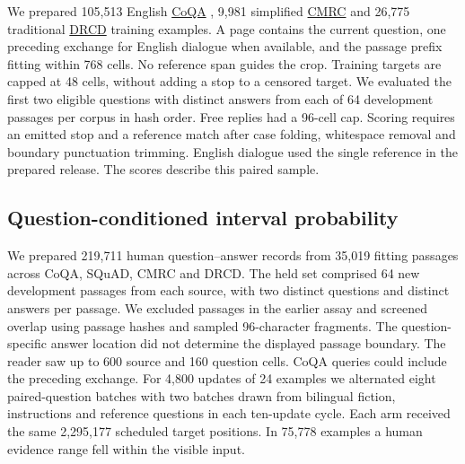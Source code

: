 \documentclass[12pt,a4paper]{article}
\providecommand{\DIFadd}[1]{{\protect\color{blue} \sf #1}} %
\begin{document}
\DIFadd{We prepared 105,513 English }\href{https://stanfordnlp.github.io/coqa/}{\DIFadd{CoQA}}\DIFadd{, 9,981 simplified }\href{https://aclanthology.org/D19-1600/}{\DIFadd{CMRC}} \DIFadd{and 26,775 traditional }\href{https://github.com/DRCKnowledgeTeam/DRCD}{\DIFadd{DRCD}} \DIFadd{training examples. A page contains the current question, one preceding exchange for English dialogue when available, and the passage prefix fitting within 768 cells. No reference span guides the crop. Training targets are capped at 48 cells, without adding a stop to a censored target. We evaluated the first two eligible questions with distinct answers from each of 64 development passages per corpus in hash order. Free replies had a 96-cell cap. Scoring requires an emitted stop and a reference match after case folding, whitespace removal and boundary punctuation trimming. English dialogue used the single reference in the prepared release. The scores describe this paired sample.
}

\subsection*{\DIFadd{Question-conditioned interval probability}}
\DIFadd{We prepared 219,711 human question--answer records from 35,019 fitting passages across CoQA, SQuAD, CMRC and DRCD. The held set comprised 64 new development passages from each source, with two distinct questions and distinct answers per passage. We excluded passages in the earlier assay and screened overlap using passage hashes and sampled 96-character fragments. The question-specific answer location did not determine the displayed passage boundary. The reader saw up to 600 source and 160 question cells. CoQA queries could include the preceding exchange. For 4,800 updates of 24 examples we alternated eight paired-question batches with two batches drawn from bilingual fiction, instructions and reference questions in each ten-update cycle. Each arm received the same 2,295,177 scheduled target positions. In 75,778 examples a human evidence range fell within the visible input.
}
\end{document}
